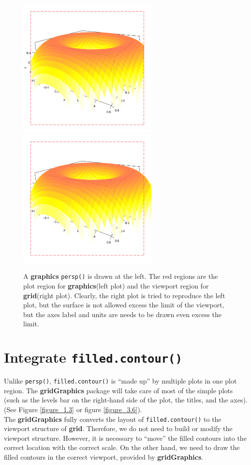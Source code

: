 \documentclass[11pt,twoside]{report}
\begin{document}
\begin{figure}[h]
	\begin{center}
		\includegraphics[height = 7cm, width = 7cm]{figure/gridGraphics_persp_demo_viewport3_1.pdf}
		\includegraphics[height = 7cm, width = 7cm]{figure/gridGraphics_persp_demo_viewport3_2.pdf}
		\caption{A \textbf{graphics} \texttt{persp()} is drawn at the left. The red regions are the plot region for \textbf{graphics}(left plot) and the viewport region for \textbf{grid}(right plot). Clearly, the right plot is tried to reproduce the left plot, but the surface is not allowed excess the limit of the viewport, but the axes label and units are needs to be drawn even excess the limit.}
		\label{figure_4.5}
	\end{center}
\end{figure}

\section{Integrate \texttt{filled.contour()}}
Unlike \texttt{persp()}, \texttt{filled.contour()} is ``made up'' by multiple plots in one plot region. The \textbf{gridGraphics} package will take care of most of the simple plots (such as the levels bar on the right-hand side of the plot, the titles, and the axes). (See Figure \ref{figure_1.3} or figure \ref{figure_3.6}).\\
The \textbf{gridGraphics} fully converts the layout of \texttt{filled.contour()} to the viewport structure of \textbf{grid}. Therefore, we do not need to build or modify the viewport structure. However, it is necessary to ``move'' the filled contours into the correct location with the correct scale. On the other hand, we need to draw the filled contours in the correct viewport, provided by \textbf{gridGraphics}.\\
\end{document}
